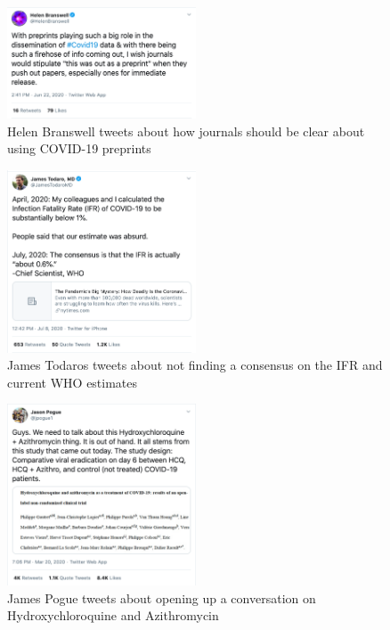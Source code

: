 \documentclass[acmsmall,authordraft]{acmart}
\begin{document}
\begin{figure}
  \includegraphics[width=0.5\textwidth]{Pictures/Appendix_Tweets/helen branswell tweet.png}
  \caption{Helen Branswell tweets about how journals should be clear about using COVID-19 preprints}
  \label{helen_branswell_tweet}
\end{figure}

\begin{figure}
  \includegraphics[width=0.5\textwidth]{Pictures/Appendix_Tweets/james todaro tweet.png}
  \caption{James Todaros tweets about not finding a consensus on the IFR and current WHO estimates}
  \label{james_todaro_tweet}
\end{figure}

\begin{figure}
  \includegraphics[width=0.5\textwidth]{Pictures/Appendix_Tweets/jason pogue tweet.png}
  \caption{James Pogue tweets about opening up a conversation on Hydroxychloroquine and Azithromycin}
  \label{jason_pogue_tweet}
\end{figure}
\end{document}
